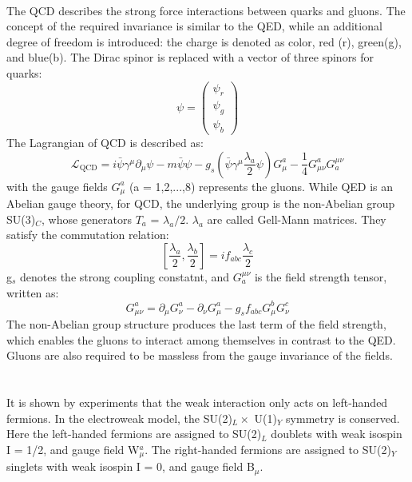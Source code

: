 \noindent\textbf{} \\ 
The QCD describes the strong force interactions between quarks and gluons. The concept of the required invariance is similar to the QED, while an additional degree of freedom is introduced: the charge is denoted as color, red (r), green(g), and blue(b). 
The Dirac spinor is replaced with a vector of three spinors for quarks:
\begin{equation}
\psi=\left(\begin{array}{c}
\psi_{r} \\
\psi_{g} \\
\psi_{b}
\end{array}\right)
\end{equation}
The Lagrangian of QCD is described as:
\begin{equation}
\mathcal{L}_{\mathrm{QCD}}=i \bar{\psi} \gamma^{\mu} \partial_{\mu} \psi-m \bar{\psi} \psi-g_{s}\left(\bar{\psi} \gamma^{\mu} \frac{\lambda_{a}}{2} \psi\right) G_{\mu}^{a}-\frac{1}{4} G_{\mu \nu}^{a} G_{a}^{\mu \nu}
\end{equation}
with the gauge fields $G_{\mu}^{a}$ (a = 1,2,...,8) represents the gluons.
While QED is an Abelian gauge theory, for QCD, the underlying group is the non-Abelian group SU(3)$_C$, whose generators $T_a$ = $\lambda_{a}/2$. 
$\lambda_{a}$ are called Gell-Mann matrices. They satisfy the commutation relation:
\begin{equation}
\left[\frac{\lambda_{a}}{2}, \frac{\lambda_{b}}{2}\right]=i f_{a b c} \frac{\lambda_{c}}{2}
\end{equation}
g$_s$ denotes the strong coupling constatnt, and $G_{a}^{\mu \nu}$ is the field strength tensor, written as:
\begin{equation}
G_{\mu \nu}^{a}=\partial_{\mu} G_{\nu}^{a}-\partial_{\nu} G_{\mu}^{a}-g_{s} f_{a b c} G_{\mu}^{b} G_{\nu}^{c}
\end{equation}
The non-Abelian group structure produces the last term of the field strength, which enables the gluons to interact among themselves in contrast to the QED. 
Gluons are also required to be massless from the gauge invariance of the fields.
\\ \\
\noindent\textbf{} \\
It is shown by experiments that the weak interaction only acts on left-handed fermions. In the electroweak model, the SU(2)$_L \times$ U(1)$_Y$ symmetry is conserved. Here the left-handed fermions are assigned to SU(2)$_L$ doublets with weak isospin I = 1/2, and gauge field W$^a_\mu$. The right-handed fermions are assigned to  SU(2)$_Y$ singlets with weak isospin I = 0, and gauge field B$_\mu$.
